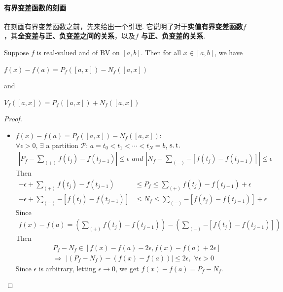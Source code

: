 \paragraph{有界变差函数的刻画}
	在刻画有界变差函数之前，先来给出一个引理. 它说明了对于\textbf{实值有界变差函数}$f$，其\textbf{全变差与正、负变差之间的关系}，以及\textbf{$f$ 与正、负变差的关系}.
	\begin{lemma}\label{lemma 4.4.2}
		Suppose $f$ is real-valued and of BV on $[a , b]$. Then for all $x \in [a , b]$, we have
		\begin{center}
			$f(x) - f(a) = P_{f}([a , x]) - N_{f}([a , x])$
		\end{center}
		and
		\begin{center}
			$V_{f}([a , x]) = P_{f}([a , x]) + N_{f}([a , x])$
		\end{center}
	
		\vspace{4em}
		\begin{proof}
			\begin{itemize}
				\item $f(x) - f(a) = P_{f}([a , x]) - N_{f}([a , x])$: \\
				$\forall \epsilon > 0$, $\exists$ a partition $\mathcal{P}$: $a = t_0 < t_1 < \cdots < t_N = b$, $\operatorname{s.t.}$
				\begin{align}
					\left| P_{f} - \sum_{(+)}{f(t_j) - f(t_{j - 1})} \right| \leq \epsilon \,\, and \,\, 
					\left| N_{f} - \sum_{(-)}{- \left[ f(t_j) - f(t_{j - 1}) \right]} \right| \leq \epsilon
				\end{align}
				Then
				\begin{align}
					-\epsilon + \sum_{(+)}{f(t_j) - f(t_{j - 1})}
					&\leq P_{f} 
					\leq \sum_{(+)}{f(t_j) - f(t_{j - 1})} + \epsilon \\
					-\epsilon + \sum_{(-)}{- \left[ f(t_j) - f(t_{j - 1}) \right]}
					&\leq N_{f} 
					\leq \sum_{(-)}{- \left[ f(t_j) - f(t_{j - 1}) \right]} + \epsilon
				\end{align}
				Since 
				\begin{align}
					f(x) - f(a) 
					= \left( \sum_{(+)}{f(t_j) - f(t_{j - 1})} \right) - \left( \sum_{(-)}{- \left[ f(t_j) - f(t_{j - 1}) \right]} \right)
				\end{align}
				Then
				\begin{align}
					&P_{f} - N_{f} \in \left[ f(x) - f(a) - 2\epsilon , f(x) - f(a) + 2\epsilon \right] \\
					&\Rightarrow \,\, \left| \left( P_{f} - N_{f} \right) - \left( f(x) - f(a) \right) \right| \leq 2\epsilon , \,\, \forall \epsilon > 0
				\end{align}
				Since $\epsilon$ is arbitrary, letting $\epsilon \to 0$, we get $f(x) - f(a) = P_{f} - N_{f}$.
				

\end{itemize}
\end{proof}
\end{lemma}
